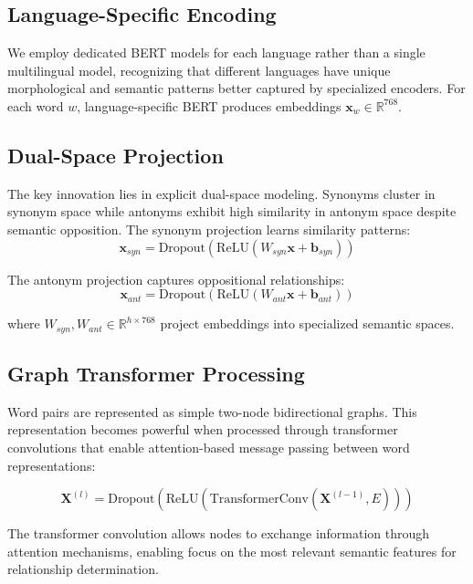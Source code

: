 \documentclass[11pt]{article}
\begin{document}
\subsection{Language-Specific Encoding}
We employ dedicated BERT models for each language rather than a single multilingual model, recognizing that different languages have unique morphological and semantic patterns better captured by specialized encoders. For each word $w$, language-specific BERT produces embeddings $\mathbf{x}_w \in \mathbb{R}^{768}$.

\subsection{Dual-Space Projection}
The key innovation lies in explicit dual-space modeling. Synonyms cluster in synonym space while antonyms exhibit high similarity in antonym space despite semantic opposition. The synonym projection learns similarity patterns:
\begin{equation}
\mathbf{x}_{syn} = \text{Dropout}(\text{ReLU}(W_{syn}\mathbf{x} + \mathbf{b}_{syn}))
\end{equation}

The antonym projection captures oppositional relationships:
\begin{equation}
\mathbf{x}_{ant} = \text{Dropout}(\text{ReLU}(W_{ant}\mathbf{x} + \mathbf{b}_{ant}))
\end{equation}

where $W_{syn}, W_{ant} \in \mathbb{R}^{h \times 768}$ project embeddings into specialized semantic spaces.

\subsection{Graph Transformer Processing}
Word pairs are represented as simple two-node bidirectional graphs. This representation becomes powerful when processed through transformer convolutions that enable attention-based message passing between word representations:

\begin{equation}
\mathbf{X}^{(l)} = \text{Dropout}(\text{ReLU}(\text{TransformerConv}(\mathbf{X}^{(l-1)}, E)))
\end{equation}

The transformer convolution allows nodes to exchange information through attention mechanisms, enabling focus on the most relevant semantic features for relationship determination.
\end{document}

